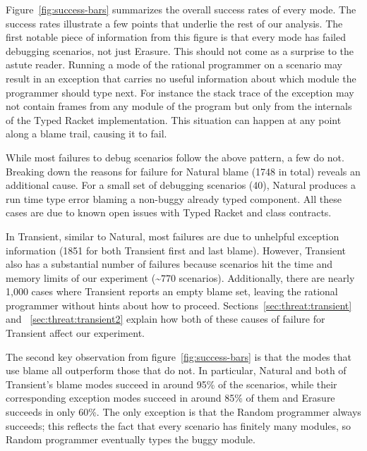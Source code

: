 Figure~\ref{fig:success-bars} summarizes the overall success rates of
every mode.  The success rates illustrate a few points that underlie the
rest of our analysis.  The first notable piece of information from this
figure is that every mode has failed debugging scenarios, not just
Erasure. This should not come as a surprise to the astute reader.  Running
a mode of the rational programmer on a scenario may result in an exception
that carries no useful information about which module the programmer
should type next. For instance the stack trace of the exception may not
contain frames from any module of the program but only from the internals
of the Typed Racket implementation. This situation can happen at any point
along a blame trail, causing it to fail.

While most failures to debug scenarios follow the above pattern, a few do
not.  Breaking down the reasons for failure for Natural blame (1748 in
total) reveals an additional cause. For a small set of debugging scenarios
(40), Natural produces a run time type error blaming a non-buggy already
typed component. All these cases are due to known open issues with Typed
Racket and class contracts. 

In Transient, similar to Natural, most failures are due to unhelpful
exception information (1851 for both Transient first and last blame).
However, Transient also has a substantial number of failures because
scenarios hit the time and memory limits of our experiment
(\textasciitilde770 scenarios).  Additionally, there are nearly 1,000
cases where Transient reports an empty blame set, leaving the rational
programmer without hints about how to proceed.
Sections~\ref{sec:threat:transient} and ~\ref{sec:threat:transient2}
explain how both of these causes of failure for Transient affect our
experiment. 

The second key observation from figure~\ref{fig:success-bars} is that the
modes that use blame all outperform those that do not.  In particular,
Natural and both of Transient's blame modes succeed in around 95\% of the
scenarios, while their corresponding exception modes succeed in around
85\% of them and Erasure succeeds in only 60\%.  The only
exception is that the Random programmer always succeeds; this reflects the
fact that every scenario has finitely many modules, so Random programmer 
eventually types the buggy module.


